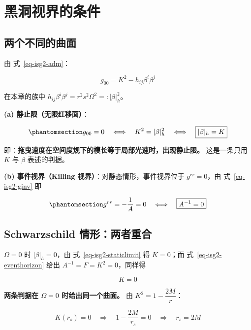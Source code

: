 \documentclass[
  chinese,
  a4paper,
  UTF8,
  12pt,
  oneside,
  openany]{ctexbook}
\theoremstyle{plain}
\theoremstyle{plain}
\theoremstyle{plain}
\theoremstyle{definition}
\theoremstyle{plain}
\theoremstyle{plain}
\theoremstyle{remark}
\begin{document}
\section{黑洞视界的条件}\label{sec-isg2-horizon}

\subsection{两个不同的曲面}\label{ux4e24ux4e2aux4e0dux540cux7684ux66f2ux9762}

由 式~\ref{eq-isg2-adm}：

\[
g_{00}=K^{2}-h_{ij}\beta^{i}\beta^{j}
\]

在本章的族中
\(h_{ij}\beta^{i}\beta^{j}=r^{2}s^{2}\Omega^{2}=:\lvert\beta\rvert^{2}_{h}\)。

\textbf{(a) 静止限（无限红移面）}：

\begin{equation}\protect\phantomsection\label{eq-isg2-staticlimit}{
g_{00}=0\quad\Longleftrightarrow\quad K^{2}=\lvert\beta\rvert^{2}_{h}\quad\Longleftrightarrow\quad \boxed{\lvert\beta\rvert_{h}=K}
}\end{equation}

即：\textbf{拖曳速度在空间度规下的模长等于局部光速时，出现静止限。}
这是一条只用 \(K\) 与 \(\beta\) 表述的判据。

\textbf{(b) 事件视界（Killing 视界）}：对静态情形，事件视界位于
\(g^{rr}=0\)，由 式~\ref{eq-isg2-ginv} 即

\begin{equation}\protect\phantomsection\label{eq-isg2-eventhorizon}{
g^{rr}=-\frac{1}{A}=0\quad\Longleftrightarrow\quad \boxed{A^{-1}=0}
}\end{equation}

\subsection{Schwarzschild
情形：两者重合}\label{schwarzschild-ux60c5ux5f62ux4e24ux8005ux91cdux5408}

\(\Omega=0\) 时 \(\lvert\beta\rvert_{h}=0\)，由
式~\ref{eq-isg2-staticlimit} 得 \(K=0\)；而
式~\ref{eq-isg2-eventhorizon} 给出 \(A^{-1}=F=K^{2}=0\)，同样得

\[
K=0
\]

\textbf{两条判据在 \(\Omega=0\) 时给出同一个曲面。} 由
\(K^{2}=1-\dfrac{2M}{r}\)：

\[
K(r_s)=0\quad\Longrightarrow\quad 1-\frac{2M}{r_s}=0\quad\Longrightarrow\quad r_s=2M
\]
\end{document}
